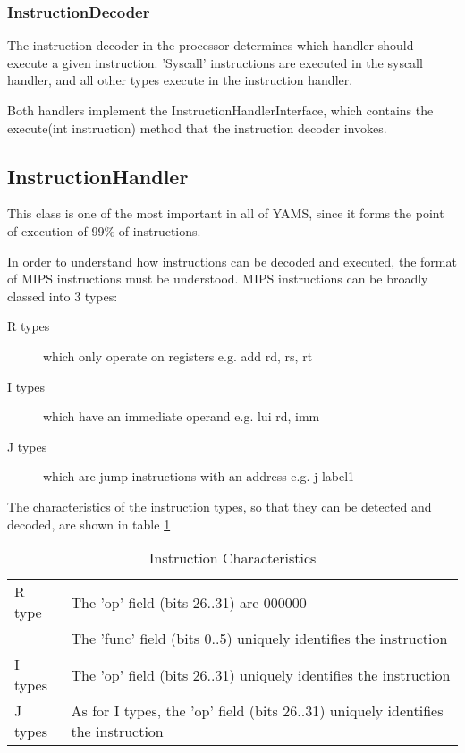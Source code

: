 \subsubsection{InstructionDecoder}

The instruction decoder in the processor determines which handler should execute a given instruction. 'Syscall' instructions are executed in the syscall handler, and all other types execute in the instruction handler.

Both handlers implement the InstructionHandlerInterface, which contains the execute(int instruction) method that the instruction decoder invokes.

\subsection{InstructionHandler}

This class is one of the most important in all of YAMS, since it forms the point of execution of 
99\% of instructions.

In order to understand how instructions can be decoded and executed, the format of MIPS instructions must be understood. MIPS instructions can be broadly classed into 3 types:

\begin{description}
\item[R types] which only operate on registers e.g. add rd, rs, rt
\item[I types] which have an immediate operand e.g. lui rd, imm
\item[J types] which are jump instructions with an address e.g. j label1
\end{description}

The characteristics of the instruction types, so that they can be detected and decoded, are shown in table \ref{tab:InstructionCharacteristics}

\begin{table}
\begin{center}
	\begin{tabular}{|l|l|}
	\hline
	R type	&	The 'op' field (bits 26..31) are 000000 \\
			&	The 'func' field (bits 0..5) uniquely identifies the instruction \\
	I types	&	The 'op' field (bits 26..31) uniquely identifies the instruction \\
	J types	&	As for I types, the 'op' field (bits 26..31) uniquely identifies the instruction \\
	\hline
	\end{tabular}
\caption{Instruction Characteristics}
\label{tab:InstructionCharacteristics}
\end{center}
\end{table}

